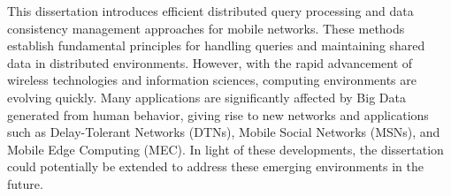 This dissertation introduces efficient distributed query processing and data consistency management approaches for mobile networks. These methods establish fundamental principles for handling queries and maintaining shared data in distributed environments. However, with the rapid advancement of wireless technologies and information sciences, computing environments are evolving quickly. Many applications are significantly affected by Big Data generated from human behavior, giving rise to new networks and applications such as Delay-Tolerant Networks (DTNs), Mobile Social Networks (MSNs), and Mobile Edge Computing (MEC). In light of these developments, the dissertation could potentially be extended to address these emerging environments in the future.